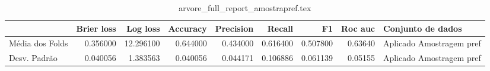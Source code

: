 \begin{table}
\centering
\caption{arvore_full_report_amostrapref.tex}
\label{arvore_full_report_amostrapref.tex}
\begin{tabular}{lrrrrrrrl}
\toprule
{} &  Brier  loss &   Log loss &  Accuracy  &  Precision  &   Recall  &       F1  &  Roc auc  &         Conjunto de dados \\
\midrule
Média dos Folds &     0.356000 &  12.296100 &   0.644000 &    0.434000 &  0.616400 &  0.507800 &   0.63640 &  Aplicado Amostragem pref \\
Desv. Padrão    &     0.040056 &   1.383563 &   0.040056 &    0.044171 &  0.106886 &  0.061139 &   0.05155 &  Aplicado Amostragem pref \\
\bottomrule
\end{tabular}
\end{table}
